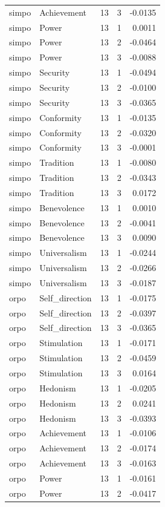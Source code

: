 \begin{tabular}{llrrr}
simpo & Achievement & 13 & 3 & -0.0135 \\
simpo & Power & 13 & 1 & 0.0011 \\
simpo & Power & 13 & 2 & -0.0464 \\
simpo & Power & 13 & 3 & -0.0088 \\
simpo & Security & 13 & 1 & -0.0494 \\
simpo & Security & 13 & 2 & -0.0100 \\
simpo & Security & 13 & 3 & -0.0365 \\
simpo & Conformity & 13 & 1 & -0.0135 \\
simpo & Conformity & 13 & 2 & -0.0320 \\
simpo & Conformity & 13 & 3 & -0.0001 \\
simpo & Tradition & 13 & 1 & -0.0080 \\
simpo & Tradition & 13 & 2 & -0.0343 \\
simpo & Tradition & 13 & 3 & 0.0172 \\
simpo & Benevolence & 13 & 1 & 0.0010 \\
simpo & Benevolence & 13 & 2 & -0.0041 \\
simpo & Benevolence & 13 & 3 & 0.0090 \\
simpo & Universalism & 13 & 1 & -0.0244 \\
simpo & Universalism & 13 & 2 & -0.0266 \\
simpo & Universalism & 13 & 3 & -0.0187 \\
orpo & Self\_direction & 13 & 1 & -0.0175 \\
orpo & Self\_direction & 13 & 2 & -0.0397 \\
orpo & Self\_direction & 13 & 3 & -0.0365 \\
orpo & Stimulation & 13 & 1 & -0.0171 \\
orpo & Stimulation & 13 & 2 & -0.0459 \\
orpo & Stimulation & 13 & 3 & 0.0164 \\
orpo & Hedonism & 13 & 1 & -0.0205 \\
orpo & Hedonism & 13 & 2 & 0.0241 \\
orpo & Hedonism & 13 & 3 & -0.0393 \\
orpo & Achievement & 13 & 1 & -0.0106 \\
orpo & Achievement & 13 & 2 & -0.0174 \\
orpo & Achievement & 13 & 3 & -0.0163 \\
orpo & Power & 13 & 1 & -0.0161 \\
orpo & Power & 13 & 2 & -0.0417 \\

\end{tabular}

